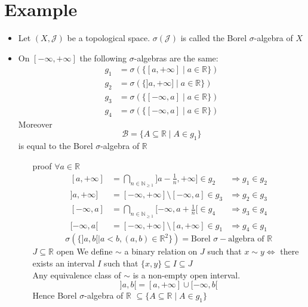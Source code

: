 \documentclass{book}
\newcommand{\leftbracket}{[}
\newcommand{\rightbracket}{]}
\begin{document}
\section{Example}
\begin{itemize}
    \item Let $(X,\mathcal{J})$ be a topological space. $\sigma(\mathcal{J})$ is called the Borel $\sigma$-algebra of $X$
    \item On $[-\infty,+\infty]$ the following $\sigma$-algebras are the same:
    $$\begin{aligned}
        g_1 &=\sigma(\{[a,+\infty]\mid a\in \mathbb{R}\})\\
        g_2 &=\sigma(\{\rightbracket a,+\infty\rightbracket\mid a\in \mathbb{R}\})\\
        g_3 &=\sigma(\{\leftbracket -\infty,a\rightbracket\mid a\in \mathbb{R}\})\\
        g_4 &=\sigma(\{\leftbracket -\infty,a\rightbracket\mid a\in \mathbb{R}\})
    \end{aligned}$$
    Moreover $$\mathscr{B}=\{A\subseteq\mathbb{R}\mid A\in g_1\}$$ is equal to the Borel $\sigma$-algebra of $\mathbb{R}$
    \begin{itemize}
        \item [proof]
        $\forall a\in \mathbb{R}$
        $$\begin{aligned}
            \leftbracket a,+\infty\rightbracket &=\bigcap\limits_{n\in \mathbb{N}_{\geq 1}}\rightbracket a-\frac{1}{n},+\infty\rightbracket\in g_2 &\Rightarrow g_1\in g_2\\
            \rightbracket a,+\infty\rightbracket &=[-\infty,+\infty]\setminus[-\infty,a]\in g_3 &\Rightarrow g_2\in g_3\\
            \leftbracket -\infty,a\rightbracket &=\bigcap\limits_{n\in \mathbb{N}_{\geq 1}}\leftbracket-\infty,a+\frac{1}{n}\leftbracket\in g_4 &\Rightarrow g_3\in g_4\\
            \leftbracket -\infty,a\leftbracket &=[-\infty,+\infty]\setminus\leftbracket a,+\infty\rightbracket\in g_1 & \Rightarrow g_4\in g_1
        \end{aligned}$$
        $$\sigma(\{\rightbracket a,b\leftbracket\mid a<b,(a,b)\in \mathbb{R}^2\})=\text{Borel }\sigma-\text{algebra of }\mathbb{R}$$
        $J\subseteq\mathbb{R}$ open We define $\sim$ a binary relation on $J$ such that $x\sim y\Leftrightarrow$ there exists an interval $I$ such that $\{x,y\}\subseteq I\subseteq J$ \\Any equivalence class of $\sim$ is a non-empty open interval.
        $$\rightbracket a,b\leftbracket=\leftbracket a,+\infty\rightbracket\cup\leftbracket -\infty,b\leftbracket$$
        Hence Borel $\sigma$-algebra of $\mathbb{R}$ $\subseteq\{A\subseteq\mathbb{R}\mid A\in g_1\}$ 
    \end{itemize}
\end{itemize}
\end{document}

